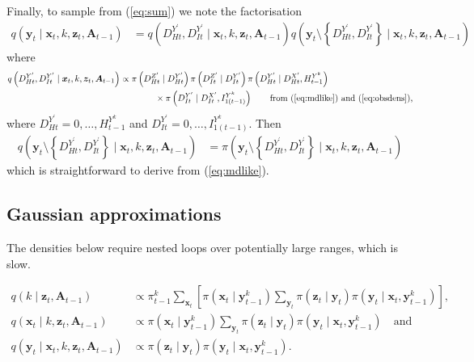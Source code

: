 \documentclass[a4paper]{article}
\newcommand{\bx}{\bm{x}}
\newcommand{\by}{\bm{y}}
\newcommand{\bz}{\bm{z}}
\newcommand{\bA}{\bm{A}}
\begin{document}
Finally, to sample from (\ref{eq:sum}) we note the factorisation
\begin{align}
    q\left(\by_t \mid \bx_t, k, \bz_t, \bA_{t - 1}\right) &= q\left(D^{Y^\prime}_{Ht}, D^{Y^\prime}_{It} \mid \bx_t, k, \bz_t, \bA_{t - 1}\right)q\left(\by_t \setminus \left\{D^{Y^\prime}_{Ht}, D^{Y^\prime}_{It}\right\} \mid \bx_t, k, \bz_t, \bA_{t - 1}\right)
\end{align}
where
\begin{align}
    q\left(D^{Y^\prime}_{Ht}, D^{Y^\prime}_{It} \mid \bx_t, k, \bz_t, \bA_{t - 1}\right) &\propto \pi\left(D^{Z^\prime}_{Ht} \mid D^{Y^\prime}_{Ht}\right)\pi\left(D^{Z^\prime}_{It} \mid D^{Y^\prime}_{It}\right)\pi\left(D^{Y^\prime}_{Ht} \mid D^{X^\prime}_{Ht}, H^{Y^k}_{t - 1}\right)\nonumber\\
    & \qquad \qquad \times \pi\left(D^{Y^\prime}_{It} \mid D^{X^\prime}_{It}, I^{Y^k}_{1(t - 1)}\right) \qquad \mbox{from (\ref{eq:mdlike}) and (\ref{eq:obsdens})},
\end{align}
where $D^{Y^\prime}_{Ht} = 0, \dots, H^{Y^k}_{t - 1}$ and $D^{Y^\prime}_{It} = 0, \dots, I^{Y^k}_{1(t - 1)}$. Then
\begin{align}
    q\left(\by_t \setminus \left\{D^{Y^\prime}_{Ht}, D^{Y^\prime}_{It}\right\} \mid \bx_t, k, \bz_t, \bA_{t - 1}\right) &= \pi\left(\by_t \setminus \left\{D^{Y^\prime}_{Ht}, D^{Y^\prime}_{It}\right\} \mid \bx_t, k, \bz_t, \bA_{t - 1}\right)
\end{align}
which is straightforward to derive from (\ref{eq:mdlike}).

\subsection{Gaussian approximations}

The densities below require nested loops over potentially large ranges, which is slow.

\begin{align}
    q\left(k \mid \bz_t, \bA_{t - 1}\right) &\propto \pi^k_{t - 1} \sum_{\bx_t}\left[ \pi\left(\bx_t \mid \by^k_{t - 1}\right) \sum_{\by_t} \pi\left(\bz_t \mid \by_t\right)\pi\left(\by_t \mid \bx_t, \by^k_{t - 1}\right)\right],\\
    q\left(\bx_t \mid k, \bz_t, \bA_{t - 1}\right) &\propto \pi\left(\bx_t \mid \by^k_{t - 1}\right) \sum_{\by_t} \pi\left(\bz_t \mid \by_t\right)\pi\left(\by_t \mid \bx_t, \by^k_{t - 1}\right)\quad\mbox{and} \\
    q\left(\by_t \mid \bx_t, k, \bz_t, \bA_{t - 1}\right) &\propto \pi\left(\bz_t \mid \by_t\right)\pi\left(\by_t \mid \bx_t, \by^k_{t - 1}\right).
\end{align}
\end{document}
